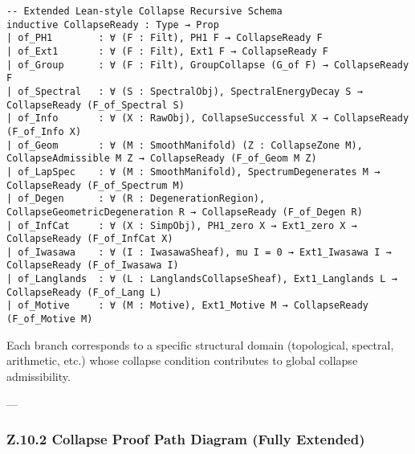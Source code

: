 \documentclass[11pt]{article}
\begin{document}
\begin{lstlisting}[mathescape=false]
-- Extended Lean-style Collapse Recursive Schema
inductive CollapseReady : Type → Prop
| of_PH1        : ∀ (F : Filt), PH1 F → CollapseReady F
| of_Ext1       : ∀ (F : Filt), Ext1 F → CollapseReady F
| of_Group      : ∀ (F : Filt), GroupCollapse (G_of F) → CollapseReady F
| of_Spectral   : ∀ (S : SpectralObj), SpectralEnergyDecay S → CollapseReady (F_of_Spectral S)
| of_Info       : ∀ (X : RawObj), CollapseSuccessful X → CollapseReady (F_of_Info X)
| of_Geom       : ∀ (M : SmoothManifold) (Z : CollapseZone M), CollapseAdmissible M Z → CollapseReady (F_of_Geom M Z)
| of_LapSpec    : ∀ (M : SmoothManifold), SpectrumDegenerates M → CollapseReady (F_of_Spectrum M)
| of_Degen      : ∀ (R : DegenerationRegion), CollapseGeometricDegeneration R → CollapseReady (F_of_Degen R)
| of_InfCat     : ∀ (X : SimpObj), PH1_zero X → Ext1_zero X → CollapseReady (F_of_InfCat X)
| of_Iwasawa    : ∀ (I : IwasawaSheaf), mu I = 0 → Ext1_Iwasawa I → CollapseReady (F_of_Iwasawa I)
| of_Langlands  : ∀ (L : LanglandsCollapseSheaf), Ext1_Langlands L → CollapseReady (F_of_Lang L)
| of_Motive     : ∀ (M : Motive), Ext1_Motive M → CollapseReady (F_of_Motive M)
\end{lstlisting}

Each branch corresponds to a specific structural domain (topological, spectral, arithmetic, etc.) whose collapse condition contributes to global collapse admissibility.

---

\subsubsection*{Z.10.2 Collapse Proof Path Diagram (Fully Extended)}
\end{document}
